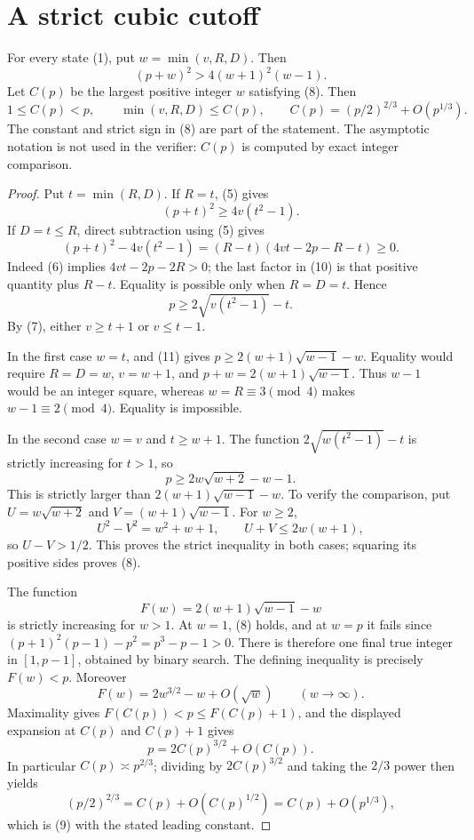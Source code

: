 \section{A strict cubic cutoff}
\begin{theorem}\label{thm:cubic}
For every state (1), put $w=\min(v,R,D)$. Then
\[
 \boxed{(p+w)^2>4(w+1)^2(w-1).}                         \tag{8}
\]
Let $C(p)$ be the largest positive integer $w$ satisfying (8). Then
\[
 1\le C(p)<p,\qquad \min(v,R,D)\le C(p),
 \qquad C(p)=(p/2)^{2/3}+O(p^{1/3}).                    \tag{9}
\]
The constant and strict sign in (8) are part of the statement. The asymptotic
notation is not used in the verifier: $C(p)$ is computed by exact integer
comparison.
\end{theorem}
\begin{proof}
Put $t=\min(R,D)$. If $R=t$, (5) gives
\[
 (p+t)^2\ge4v(t^2-1).
\]
If $D=t\le R$, direct subtraction using (5) gives
\[
 (p+t)^2-4v(t^2-1)
 =(R-t)(4vt-2p-R-t)\ge0.                                \tag{10}
\]
Indeed (6) implies $4vt-2p-2R>0$; the last factor in (10) is that positive
quantity plus $R-t$. Equality is possible only when $R=D=t$. Hence
\[
 p\ge 2\sqrt{v(t^2-1)}-t.                               \tag{11}
\]
By (7), either $v\ge t+1$ or $v\le t-1$.

In the first case $w=t$, and (11) gives
$p\ge2(w+1)\sqrt{w-1}-w$.
Equality would require $R=D=w$, $v=w+1$, and
$p+w=2(w+1)\sqrt{w-1}$. Thus $w-1$ would be an integer square, whereas
$w=R\equiv3\pmod4$ makes $w-1\equiv2\pmod4$. Equality is impossible.

In the second case $w=v$ and $t\ge w+1$. The function
$2\sqrt{w(t^2-1)}-t$ is strictly increasing for $t>1$, so
\[
 p\ge2w\sqrt{w+2}-w-1.
\]
This is strictly larger than $2(w+1)\sqrt{w-1}-w$. To verify the comparison,
put $U=w\sqrt{w+2}$ and $V=(w+1)\sqrt{w-1}$. For $w\ge2$,
\[
 U^2-V^2=w^2+w+1,\qquad U+V\le2w(w+1),
\]
so $U-V>1/2$. This proves the strict inequality in both cases; squaring its
positive sides proves (8).

The function
\[
 F(w)=2(w+1)\sqrt{w-1}-w
\]
is strictly increasing for $w>1$.
At $w=1$, (8) holds, and at $w=p$ it fails since
$(p+1)^2(p-1)-p^2=p^3-p-1>0$. There is therefore one final true integer in
$[1,p-1]$, obtained by binary search.  The defining inequality is precisely
$F(w)<p$.  Moreover
\[
 F(w)=2w^{3/2}-w+O(\sqrt w)\qquad(w\longrightarrow\infty).
\]
Maximality gives $F(C(p))<p\le F(C(p)+1)$, and the displayed expansion at
$C(p)$ and $C(p)+1$ gives
\[
 p=2C(p)^{3/2}+O(C(p)).
\]
In particular $C(p)\asymp p^{2/3}$; dividing by $2C(p)^{3/2}$ and taking the
$2/3$ power then yields
\[
 (p/2)^{2/3}=C(p)+O(C(p)^{1/2})
             =C(p)+O(p^{1/3}),
\]
which is (9) with the stated leading constant.
\end{proof}

